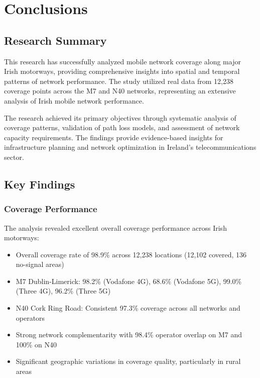 \documentclass[MScCS]{uccthesis}
\begin{document}
\chapter{Conclusions}

\section{Research Summary}
This research has successfully analyzed mobile network coverage along major Irish motorways, providing comprehensive insights into spatial and temporal patterns of network performance. The study utilized real data from 12,238 coverage points across the M7 and N40 networks, representing an extensive analysis of Irish mobile network performance.

The research achieved its primary objectives through systematic analysis of coverage patterns, validation of path loss models, and assessment of network capacity requirements. The findings provide evidence-based insights for infrastructure planning and network optimization in Ireland's telecommunications sector.

\section{Key Findings}

\subsection{Coverage Performance}
The analysis revealed excellent overall coverage performance across Irish motorways:
\begin{itemize}
\item Overall coverage rate of 98.9\% across 12,238 locations (12,102 covered, 136 no-signal areas)
\item M7 Dublin-Limerick: 98.2\% (Vodafone 4G), 68.6\% (Vodafone 5G), 99.0\% (Three 4G), 96.2\% (Three 5G)
\item N40 Cork Ring Road: Consistent 97.3\% coverage across all networks and operators
\item Strong network complementarity with 98.4\% operator overlap on M7 and 100\% on N40
\item Significant geographic variations in coverage quality, particularly in rural areas
\end{itemize}
\end{document}
